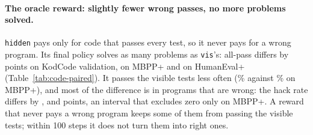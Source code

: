 \begin{table}[t]
\centering\small

\caption{Final policies (greedy, up to three attempts): visible tests pass (\emph{vis}), every test passes
(\emph{all}), and visible tests pass but a held-out test fails (\emph{hack}), in percent of problems; seed means.}
\label{tab:code-grpo}
\end{table}

\paragraph{The oracle reward: slightly fewer wrong passes, no more problems solved.} \texttt{hidden} pays only for code
that passes every test, so it never pays for a wrong program. Its final policy solves as many problems as
\texttt{vis}'s: all-pass differs by  
points on KodCode validation,   on
MBPP+ and   on HumanEval+
(Table~\ref{tab:code-paired}). It passes the visible tests less often (\% against
\% on MBPP+), and most of the difference is in programs that are wrong: the hack rate differs by
 ,
  and
  points, an interval that excludes zero
only on MBPP+.
A reward that never pays a wrong program keeps some of them from passing the visible tests; within 100 steps it does
not turn them into right ones.

\begin{table}[t]
\centering\small

\caption{Paired differences to \texttt{vis} in percentage points: per problem, the seed mean of each condition, averaged
over problems, with a 95\% bootstrap interval over problems.}
\label{tab:code-paired}
\end{table}

